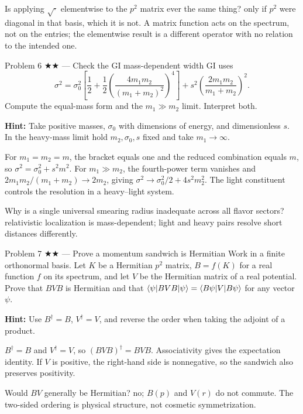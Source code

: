 \documentclass[11pt]{article}
\begin{document}
\begin{quiz}
Is applying $\sqrt{\cdot}$ elementwise to the $p^2$ matrix ever the same thing?
\answer only if $p^2$ were diagonal in that basis, which it is not. A matrix
function acts on the spectrum, not on the entries; the elementwise result is a
different operator with no relation to the intended one.
\end{quiz}

\begin{problem}{Problem 6 ★★ — Check the GI mass-dependent width}
GI uses
\[
\sigma^2=\sigma_0^2\left[\frac12+\frac12
\left(\frac{4m_1m_2}{(m_1+m_2)^2}\right)^4\right]
+s^2\left(\frac{2m_1m_2}{m_1+m_2}\right)^2.
\]
Compute the equal-mass form and the $m_1\gg m_2$ limit. Interpret both.

\textbf{Hint:} Take positive masses, $\sigma_0$ with dimensions of energy,
and dimensionless $s$. In the heavy-mass limit hold $m_2,\sigma_0,s$ fixed
and take $m_1\to\infty$.
\end{problem}
\begin{solution}
For $m_1=m_2=m$, the bracket equals one and the reduced combination equals $m$,
so $\sigma^2=\sigma_0^2+s^2m^2$. For $m_1\gg m_2$, the fourth-power term
vanishes and $2m_1m_2/(m_1+m_2)\to2m_2$, giving
$\sigma^2\to\sigma_0^2/2+4s^2m_2^2$. The light constituent controls the
resolution in a heavy--light system.
\end{solution}
\begin{quiz}
Why is a single universal smearing radius inadequate across all flavor sectors?
\answer relativistic localization is mass-dependent; light and heavy pairs
resolve short distances differently.
\end{quiz}

\begin{problem}{Problem 7 ★★ — Prove a momentum sandwich is Hermitian}
Work in a finite orthonormal basis. Let $K$ be a Hermitian $p^2$ matrix,
$B=f(K)$ for a real function $f$ on its spectrum, and let $V$ be the
Hermitian matrix of a real potential. Prove that $BVB$ is Hermitian and that
$\langle \psi\rvert BVB\lvert \psi\rangle=\langle B\psi\rvert V\lvert B\psi\rangle$ for any vector $\psi$.

\textbf{Hint:} Use $B^\dagger=B$, $V^\dagger=V$, and reverse the order
when taking the adjoint of a product.
\end{problem}
\begin{solution}
$B^\dagger=B$ and $V^\dagger=V$, so
$(BVB)^\dagger=BVB$. Associativity gives the expectation identity. If $V$ is
positive, the right-hand side is nonnegative, so the sandwich also preserves
positivity.
\end{solution}
\begin{quiz}
Would $BV$ generally be Hermitian? \answer no; $B(p)$ and $V(r)$ do not commute.
The two-sided ordering is physical structure, not cosmetic symmetrization.
\end{quiz}
\end{document}
